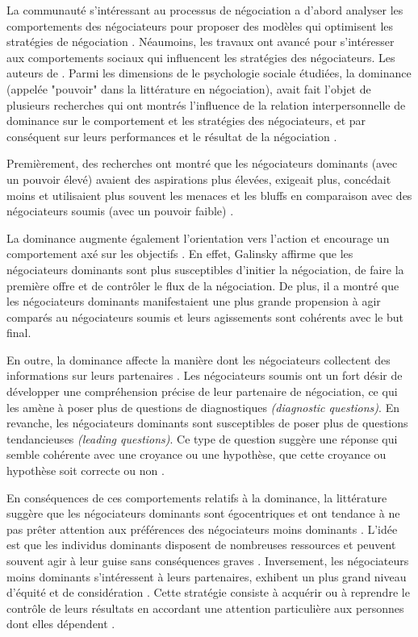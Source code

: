 	La communauté s'intéressant au processus de négociation a d'abord analyser les comportements des négociateurs pour proposer des modèles qui optimisent les stratégies de négociation \cite{thompson2010negotiation}.
	Néaumoins, les travaux ont avancé pour s'intéresser aux comportements sociaux qui influencent les stratégies des négociateurs. Les auteurs de \cite{thompson2010negotiation}. Parmi les dimensions de le psychologie sociale étudiées, la dominance  (appelée "pouvoir" dans la littérature en négociation), avait fait l'objet de plusieurs recherches qui ont montrés l'influence  de la relation interpersonnelle de dominance sur le comportement et les stratégies des négociateurs, et par conséquent sur leurs performances et le résultat de la négociation \cite{de1995impact,van2006power}.
	
	Premièrement, des recherches ont montré que les négociateurs dominants (avec un pouvoir élevé) avaient des aspirations plus élevées, exigeait plus, concédait moins et utilisaient plus souvent les menaces et les bluffs en comparaison avec des négociateurs soumis (avec un pouvoir faible) \cite{de1995impact}.
	
	
	 La dominance augmente également l'orientation vers l'action et encourage un comportement axé sur les objectifs \cite{van2006power}. En effet, Galinsky \cite{galinsky2003power} affirme que les négociateurs dominants sont plus susceptibles d'initier la négociation, de faire la première offre et de contrôler le flux de la négociation.  De plus, il a montré que les négociateurs dominants manifestaient une plus grande propension à agir comparés au négociateurs soumis et leurs agissements sont cohérents avec le but final.
	 
	 
	 En outre, la dominance affecte la manière dont les négociateurs collectent des informations sur leurs partenaires \cite{de2004influence}. Les négociateurs soumis ont un fort désir de développer une compréhension précise de leur partenaire de négociation, ce qui les amène à poser plus de questions  de diagnostiques \emph {(diagnostic questions)}.
	 En revanche, les négociateurs dominants sont susceptibles de poser plus de questions tendancieuses \emph {(leading questions)}. Ce type de question suggère une réponse  qui semble cohérente avec une croyance ou une hypothèse, que cette croyance ou hypothèse soit correcte ou non \cite{galinsky2003power}.
	
	En conséquences de ces comportements relatifs à la dominance, la littérature suggère que les négociateurs dominants sont égocentriques et ont tendance à ne pas prêter attention aux préférences des négociateurs moins dominants   \cite{fiske1993controlling, de1995impact}. L'idée est que les individus dominants disposent de nombreuses ressources et peuvent souvent agir à leur guise sans conséquences graves \cite{van2006power}. Inversement, les négociateurs moins dominants s'intéressent à leurs partenaires, exhibent un plus grand niveau d'équité et de considération \cite{de1995impact}. Cette stratégie consiste à acquérir ou à reprendre le contrôle de leurs résultats en accordant une attention particulière aux personnes dont elles dépendent \cite{fiske1993controlling}.
	
